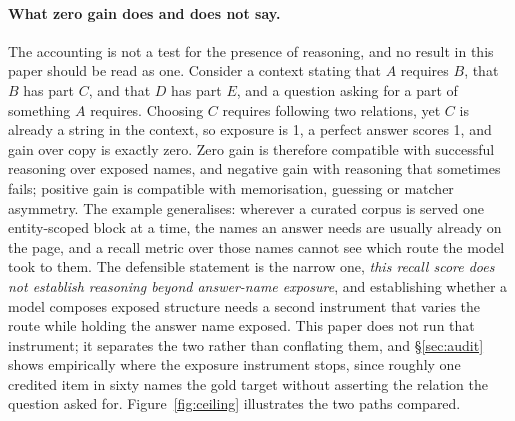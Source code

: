 \documentclass[10pt,twocolumn]{article}
\begin{document}
\paragraph{What zero gain does and does not say.} The accounting is not a test for the presence of reasoning, and no result in this paper should be read as one. Consider a context stating that $A$ requires $B$, that $B$ has part $C$, and that $D$ has part $E$, and a question asking for a part of something $A$ requires. Choosing $C$ requires following two relations, yet $C$ is already a string in the context, so exposure is 1, a perfect answer scores 1, and gain over copy is exactly zero. Zero gain is therefore compatible with successful reasoning over exposed names, and negative gain with reasoning that sometimes fails; positive gain is compatible with memorisation, guessing or matcher asymmetry. The example generalises: wherever a curated corpus is served one entity-scoped block at a time, the names an answer needs are usually already on the page, and a recall metric over those names cannot see which route the model took to them. The defensible statement is the narrow one, \emph{this recall score does not establish reasoning beyond answer-name exposure}, and establishing whether a model composes exposed structure needs a second instrument that varies the route while holding the answer name exposed. This paper does not run that instrument; it separates the two rather than conflating them, and \S\ref{sec:audit} shows empirically where the exposure instrument stops, since roughly one credited item in sixty names the gold target without asserting the relation the question asked for. Figure~\ref{fig:ceiling} illustrates the two paths compared.


\end{document}
